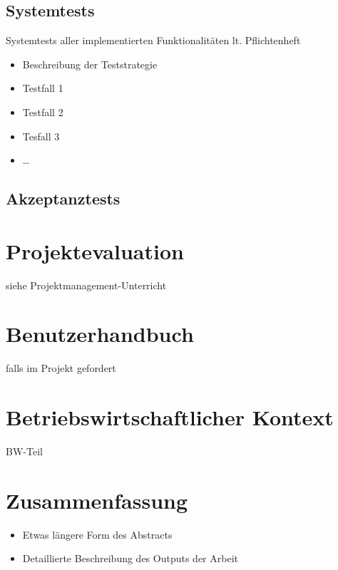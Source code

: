 \section{Systemtests} 
Systemtests aller implementierten Funktionalitäten lt. Pflichtenheft
\begin{itemize}
	\item Beschreibung der Teststrategie
	\item Testfall 1
	\item Testfall 2
	\item Tesfall 3
	\item …
\end{itemize}

\section{Akzeptanztests}

\chapter{Projektevaluation}
siehe Projektmanagement-Unterricht

\chapter{Benutzerhandbuch} 
falls im Projekt gefordert

\chapter{Betriebswirtschaftlicher Kontext}
BW-Teil

\chapter{Zusammenfassung}
\begin{itemize}
	\item Etwas längere Form des Abstracts
	\item Detaillierte Beschreibung des Outputs der Arbeit
\end{itemize}